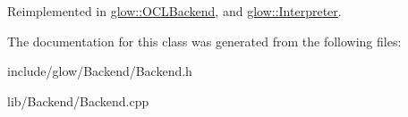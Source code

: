 Reimplemented in \hyperlink{classglow_1_1_o_c_l_backend_aa8e73591e3340113c10d5c5c86ccb642}{glow\+::\+O\+C\+L\+Backend}, and \hyperlink{classglow_1_1_interpreter_a2e26be458097546c6bbcdaf59e8f493b}{glow\+::\+Interpreter}.



The documentation for this class was generated from the following files\+:\begin{DoxyCompactItemize}
\item 
include/glow/\+Backend/Backend.\+h\item 
lib/\+Backend/Backend.\+cpp\end{DoxyCompactItemize}
